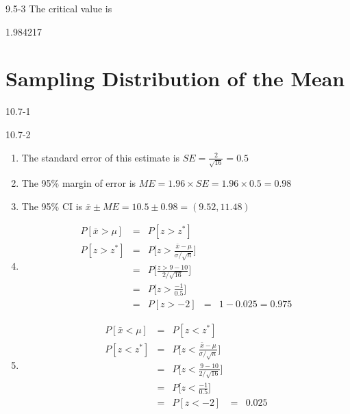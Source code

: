 \begin{exsol@solution}{9.5-3}
   The critical value is


  1.984217

\end{exsol@solution}
\setcounter{chapter}{10}\chapter{Sampling Distribution of the Mean}
\begin{exsol@solution}{10.7-1}
\end{exsol@solution}
\begin{exsol@solution}{10.7-2}
\begin{enumerate}
  \item The standard error of this estimate is $SE = \frac{2}{\sqrt{16}} = 0.5$
  \item The 95\% margin of error is $ME = 1.96 \times SE = 1.96 \times 0.5 = 0.98$
  \item The 95\% CI is $\bar{x} \pm ME = 10.5 \pm 0.98 = (9.52, 11.48) $
  \item
  \begin{eqnarray*}
      P[ \bar{x} > \mu ] &=& P[z > z^*] \\
       P[z > z^*] &=& P\Big[ z > \frac{ \bar{x}-\mu}{ \sigma/\sqrt{n}} \Big] \\
       &=& P\Big[ \frac{z > 9 - 10}{ 2/\sqrt{16}} \Big] \\
       &=& P\Big[ z > \frac{-1}{0.5} \Big]   \\
        &=& P[z > -2]
        &=& 1 - 0.025 = 0.975
  \end{eqnarray*}

  \item
  \begin{eqnarray*}
      P[ \bar{x} < \mu ] &=& P[z < z^*] \\
       P[z < z^*] &=& P\Big[ z < \frac{ \bar{x}-\mu}{ \sigma/\sqrt{n}} \Big] \\
       &=& P\Big[ z < \frac{ 9 - 10}{ 2/\sqrt{16}} \Big] \\
       &=& P\Big[ z < \frac{-1}{0.5} \Big]   \\
        &=& P[z < -2]
        &=&  0.025
  \end{eqnarray*}


\end{enumerate}
\end{exsol@solution}

